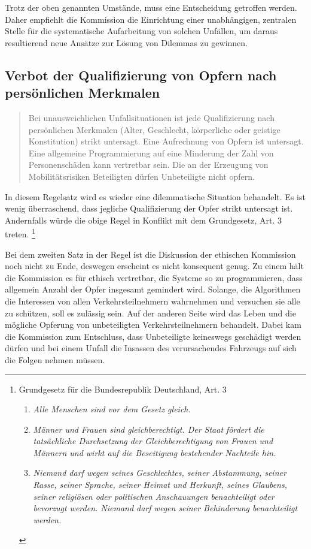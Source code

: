 \documentclass[twoside,a4paper,12pt]{article}
\begin{document}
Trotz der oben genannten Umstände, muss eine Entscheidung getroffen werden. Daher empfiehlt die Kommission die Einrichtung einer unabhängigen, zentralen Stelle für die systematische Aufarbeitung von solchen Unfällen, um daraus resultierend neue Ansätze zur Lösung von Dilemmas zu gewinnen.


\subsection{Verbot der Qualifizierung von Opfern nach persönlichen Merkmalen} \label{VerbotDerQualifizierungMoeglicherOpferNachPersönlichenMerkmalen}
\begin{quote}
\glqq
Bei unausweichlichen Unfallsituationen ist jede Qualifizierung nach persönlichen Merkmalen (Alter, Geschlecht, 
körperliche oder geistige Konstitution) strikt untersagt. Eine
Aufrechnung von Opfern ist untersagt. Eine allgemeine Programmierung auf eine Minderung der Zahl von Personenschäden 
kann vertretbar sein. Die an der Erzeugung von
Mobilitätsrisiken Beteiligten dürfen Unbeteiligte nicht opfern.\grqq\mbox{~\cite[S. 11]{ek}}
\end{quote}
In diesem Regelsatz wird es wieder eine dilemmatische Situation behandelt. Es ist wenig überraschend, dass jegliche Qualifizierung der Opfer strikt untersagt ist. Andernfalls würde die obige Regel in Konflikt mit dem Grundgesetz, Art. 3 treten.
\footnote{Grundgesetz für die Bundesrepublik Deutschland, Art. 3
\begin{enumerate} 
\item \textit{Alle Menschen sind vor dem Gesetz gleich.}
\item \textit{Männer und Frauen sind gleichberechtigt. Der Staat fördert die tatsächliche Durchsetzung der Gleichberechtigung von Frauen und Männern und wirkt auf die Beseitigung bestehender Nachteile hin.}
\item\textit{ Niemand darf wegen seines Geschlechtes, seiner Abstammung, seiner Rasse, seiner Sprache, seiner Heimat und Herkunft, seines Glaubens, seiner religiösen oder politischen Anschauungen benachteiligt oder bevorzugt werden. Niemand darf wegen seiner Behinderung benachteiligt werden.}
\end{enumerate}}

Bei dem zweiten Satz in der Regel ist die Diskussion der ethischen Kommission noch nicht zu Ende, deswegen erscheint es nicht konsequent genug. Zu einem hält die Kommission es für ethisch vertretbar, die Systeme so zu programmieren, dass allgemein Anzahl der Opfer insgesamt gemindert wird. Solange, die Algorithmen die Interessen von allen Verkehrsteilnehmern wahrnehmen und versuchen sie alle zu schützen, soll es zulässig sein. Auf der anderen Seite wird das Leben und die mögliche Opferung von unbeteiligten Verkehrsteilnehmern behandelt. Dabei kam die Kommission zum Entschluss, dass Unbeteiligte keineswegs geschädigt werden dürfen und bei einem Unfall die Insassen des verursachendes Fahrzeugs auf sich die Folgen nehmen müssen.
\end{document}
